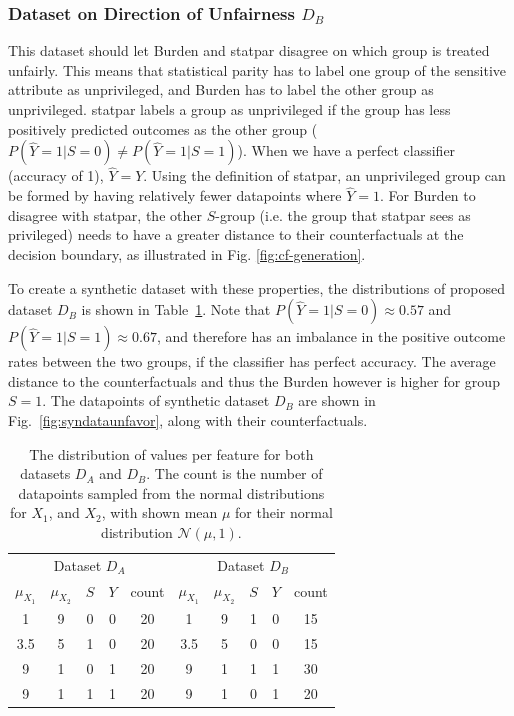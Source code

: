 \documentclass[runningheads]{llncs}
\begin{document}
\subsubsection{Dataset on Direction of Unfairness $D_B$}
This dataset should let \gls{Burden} and \gls{statpar} disagree on which group is treated unfairly. This means that statistical parity has to label one group of the sensitive attribute as unprivileged, and \gls{Burden} has to label the other group as unprivileged. \Gls{statpar} labels a group as unprivileged if the group has less positively predicted outcomes as the other group ($P(\hat{Y}=1|S=0) \neq P(\hat{Y}=1|S=1)$). When we have a perfect classifier (accuracy of 1), $\hat{Y} = Y$.
Using the definition of \gls{statpar}, an unprivileged group can be formed by having relatively fewer datapoints where $\hat{Y}=1$. For \gls{Burden} to disagree with \gls{statpar}, the other $S$-group (i.e. the group that \gls{statpar} sees as privileged) needs to have a greater distance to their counterfactuals at the decision boundary, as illustrated in Fig. \ref{fig:cf-generation}.

To create a synthetic dataset with these properties, the distributions of proposed dataset $D_B$ is shown in Table~\ref{tab:syndata}. Note that $P(\hat{Y}=1|S=0)\approx0.57$ and $P(\hat{Y}=1|S=1)\approx0.67$, and therefore has an imbalance in the positive outcome rates between the two groups, if the classifier has perfect accuracy. The average distance to the counterfactuals and thus the \gls{Burden} however is higher for group $S=1$.
The datapoints of synthetic dataset $D_B$ are shown in Fig.~\ref{fig:syndataunfavor}, along with their counterfactuals.

\begin{table}
    \centering
    \caption{The distribution of values per feature for both datasets $D_A$ and $D_B$. The count is the number of datapoints sampled from the normal distributions for $X_1$, and $X_2$, with shown mean $\mu$ for their normal distribution $\mathcal{N}(\mu, 1)$.}
    \label{tab:syndata}
    \begin{tabularx}{.7\textwidth}{@{\extracolsep{\fill}}cccccccccc}
        \toprule
        \multicolumn{5}{c}{Dataset $D_A$} & \multicolumn{5}{c}{Dataset $D_B$}\\
        \cmidrule(lr){1-5}\cmidrule(lr){6-10}
        $\mu_{X_1}$ & $\mu_{X_2}$ & $S$ & $Y$ & count & $\mu_{X_1}$ & $\mu_{X_2}$ & $S$ & $Y$ & count\\
        \midrule
        1 & 9 & 0 & 0 & 20 & \hspace{0.2cm} 1 & 9 & 1 & 0 & 15\\
        3.5 & 5 & 1 & 0 & 20 &\hspace{0.2cm} 3.5 & 5 & 0 & 0 & 15\\
        9 & 1 & 0 & 1 & 20 &\hspace{0.2cm}  9 & 1 & 1 & 1 & 30\\
        9 & 1 & 1 & 1 & 20 & \hspace{0.2cm} 9 & 1 & 0 & 1 & 20\\
        \bottomrule
    \end{tabularx}
\end{table}
\end{document}

